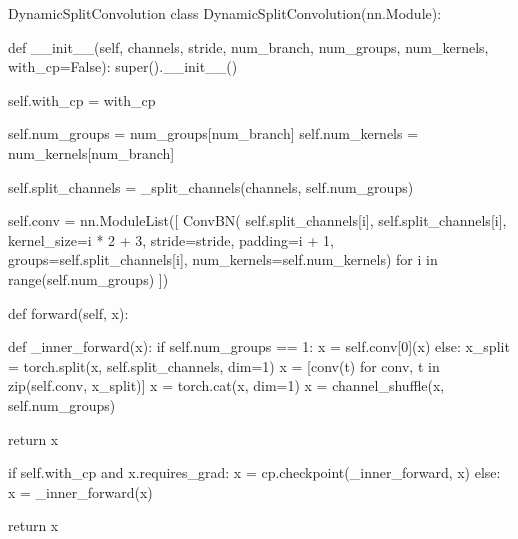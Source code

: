 \documentclass[hyperref]{ctexart}
\begin{document}
\begin{Python}{DynamicSplitConvolution}
class DynamicSplitConvolution(nn.Module):
	
	def __init__(self, channels, stride, num_branch, num_groups, num_kernels, with_cp=False):
		super().__init__()
		
		self.with_cp = with_cp
		
		self.num_groups = num_groups[num_branch]
		self.num_kernels = num_kernels[num_branch]
		
		self.split_channels = _split_channels(channels, self.num_groups)
		
		self.conv = nn.ModuleList([
		ConvBN(
		self.split_channels[i],
		self.split_channels[i],
		kernel_size=i * 2 + 3,
		stride=stride,
		padding=i + 1,
		groups=self.split_channels[i],
		num_kernels=self.num_kernels)
		for i in range(self.num_groups)
		])
		
		def forward(self, x):
		
			def _inner_forward(x):
			if self.num_groups == 1:
			x = self.conv[0](x)
			else:
			x_split = torch.split(x, self.split_channels, dim=1)
			x = [conv(t) for conv, t in zip(self.conv, x_split)]
			x = torch.cat(x, dim=1)
			x = channel_shuffle(x, self.num_groups)
			
			return x
			
			if self.with_cp and x.requires_grad:
				x = cp.checkpoint(_inner_forward, x)
			else:
				x = _inner_forward(x)
	
			return x
\end{Python}
\end{document}
